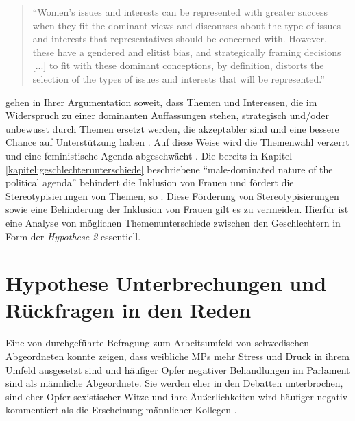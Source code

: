 \documentclass[12pt, 
    twoside=false, 
    bibliography=totoc, 
    numbers=endperiod, 
    headings=normal, 
    toc=chapterentrydotfill
    ]{scrbook}
\begin{document}
\citereset
\begin{quote}
    \enquote{Women’s issues and interests can be represented with greater success when they fit the dominant views and discourses about the type of issues and interests that representatives should be concerned with. However, these have a gendered and elitist bias, and strategically framing decisions [...] to fit with these dominant conceptions, by definition, distorts the selection of the types of issues and interests that will be represented.} \parencite[151]{celis_2018}
\end{quote}

\textcite{celis_2018} gehen in Ihrer Argumentation soweit, dass Themen und Interessen, die im Widerspruch zu einer dominanten Auffassungen stehen, strategisch und/oder unbewusst durch Themen ersetzt werden, die akzeptabler sind und eine bessere Chance auf Unterstützung haben \parencites[151]{celis_2018}{swers_2002}. 
Auf diese Weise wird die Themenwahl verzerrt und eine feministische Agenda abgeschwächt \parencite[151]{celis_2018}. Die bereits in Kapitel \ref{kapitel:geschlechterunterschiede} beschriebene \enquote{male-dominated nature of the political agenda} \parencite[151]{celis_2018} behindert die Inklusion von Frauen und fördert die Stereotypisierungen von Themen, so \textcite{celis_2018}.
Diese Förderung von Stereotypisierungen sowie eine Behinderung der Inklusion von Frauen gilt es zu vermeiden. Hierfür ist eine Analyse von möglichen Themenunterschiede zwischen den Geschlechtern in Form der \emph{Hypothese 2} essentiell. 

\section{Hypothese Unterbrechungen und Rückfragen in den Reden}\label{kapitel:hypothese3}

Eine von \textcite{erikson_2018} durchgeführte Befragung zum Arbeitsumfeld von schwedischen Abgeordneten konnte zeigen, dass weibliche MPs mehr Stress und Druck in ihrem Umfeld ausgesetzt sind und häufiger Opfer negativer Behandlungen im Parlament sind als männliche Abgeordnete. Sie werden eher in den Debatten unterbrochen, sind eher Opfer sexistischer Witze und ihre Äußerlichkeiten wird häufiger negativ kommentiert als die Erscheinung männlicher Kollegen \parencite[209]{erikson_2018}. 
\end{document}
